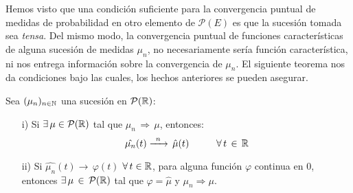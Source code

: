 Hemos visto que una condición suficiente para la convergencia puntual de medidas de probabilidad en otro elemento de $\mathcal{P}(E)$ es que la sucesión tomada sea \textit{tensa}. Del mismo modo, la convergencia puntual de funciones características de alguna sucesión de medidas $\mu_n$, no necesariamente sería función característica, ni nos entrega información sobre la convergencia de $\mu_n$. El siguiente teorema nos da condiciones bajo las cuales, los hechos anteriores se pueden asegurar.\\ \newline
\begin{teorema} Sea $(\mu_n)_{n\in\mathbb N}$ una sucesión en $\mathcal{P}(\mathbb R)$:
\begin{itemize}
    \item[i)] Si $\exists\,\mu\in\mathcal{P}(\mathbb R)$ tal que $\mu_n\,\Rightarrow\,\mu$, entonces:
    \[\hat{\mu_n}(t)\xrightarrow{\,\,\,n\,\,\,}\,\hat{\mu}(t) \hspace{1cm} \forall \, t \,\in\,\mathbb R\]
    \item[ii)] Si $\hat{\mu_n}(t)\rightarrow\,\varphi(t)$ $\forall\,t\in\mathbb R$, para alguna función $\varphi$ continua en $0$, entonces $\exists\,\mu\,\in\,\mathcal{P}(\mathbb R)$ tal que $\varphi = \hat{\mu}$ y $\mu_n \Rightarrow\mu$.
\end{itemize}
\end{teorema}


